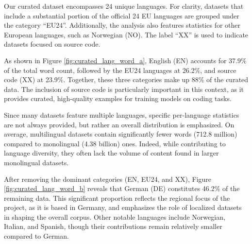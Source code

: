 Our curated dataset encompasses 24 unique languages. For clarity, datasets that include a substantial portion of the official 24 EU languages are grouped under the category “EU24”. Additionally, the analysis also features statistics for other European languages, such as Norwegian (NO). The label “XX” is used to indicate datasets focused on source code.

As shown in Figure \ref{fig:curated_lang_word_a}, English (EN) accounts for 37.9\% of the total word count, followed by the EU24 languages at 26.2\%, and source code (XX) at 23.9\%. Together, these three categories make up 88\% of the curated data. The inclusion of source code is particularly important in this context, as it provides curated, high-quality examples for training models on coding tasks.

Since many datasets feature multiple languages, specific per-language statistics are not always provided, but rather an overall distribution is emphasized.  On average, multilingual datasets contain significantly fewer words (712.8 million) compared to monolingual (4.38 billion) ones. Indeed,  while contributing to language diversity, they often lack the volume of content found in larger monolingual datasets.

After removing the dominant categories (EN, EU24, and XX), Figure \ref{fig:curated_lang_word_b} reveals that German (DE) constitutes 46.2\% of the remaining data. This significant proportion reflects the regional focus of the project, as it is based in Germany, and emphasizes the role of localized datasets in shaping the overall corpus. Other notable languages include Norwegian, Italian, and Spanish, though their contributions remain relatively smaller compared to German.




